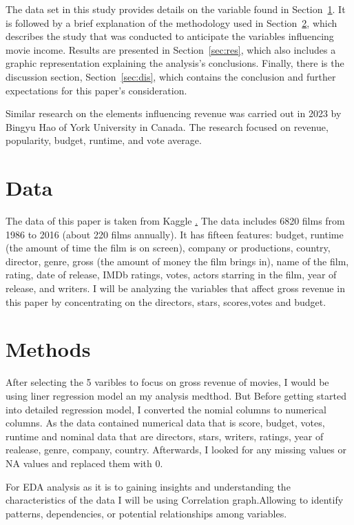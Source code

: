 \documentclass[12pt]{article}
\begin{document}
The data set in this study provides details on the variable found in Section~\ref{sec:data}. 
It is followed by a brief explanation of the methodology used in Section~\ref{sec:meth}, 
which describes the study that was conducted to anticipate the variables influencing movie 
income. Results are presented in Section~\ref{sec:res}, which also includes a graphic representation
explaining the analysis's conclusions. Finally, there is the discussion section, 
Section~\ref{sec:dis}, which contains the conclusion and further expectations for this
paper's consideration.

Similar research on the elements influencing revenue  was carried out in 2023 by Bingyu Hao 
of York University in Canada. The research focused on revenue, popularity, budget, runtime, and vote average.

\section{Data}
\label{sec:data}

The data of this paper is taken from Kaggle \href{https://www.kaggle.com/datasets/danielgrijalvas/movies}. 
The data includes 6820 films from 1986 to 2016 (about 220 films annually). It has
fifteen features: budget, runtime (the amount of time the film is on screen), company 
or productions, country, director, genre, gross (the amount of money the film brings in), 
name of the film, rating, date of release, IMDb ratings, votes, actors starring in the
film, year of release, and writers. I will be analyzing the variables that affect
gross revenue in this paper by concentrating on the directors, stars, scores,votes and budget.

\section{Methods}
\label{sec:meth}

After selecting the 5 varibles to focus on gross revenue of movies, I would be using
liner regression model an my analysis medthod. But Before getting started into detailed 
regression model, I converted the nomial columns to numerical columns. As the data contained 
numerical data that is score, budget, votes, runtime and nominal data that are directors, 
stars, writers, ratings, year of realease, genre, company, country. Afterwards, I looked 
for any missing values or NA values and replaced them with 0.

For EDA analysis as it is to gaining insights and understanding the characteristics 
of the data I will be using Correlation graph.Allowing to identify patterns, dependencies,
or potential relationships among variables.
\end{document}
